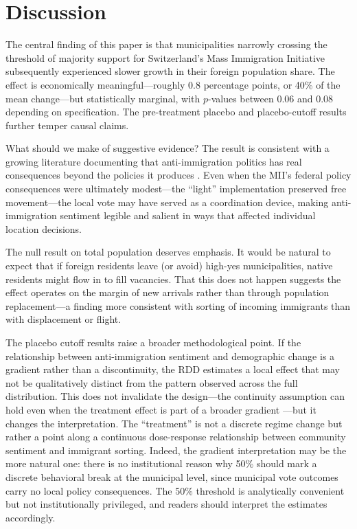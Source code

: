 \documentclass[12pt]{article}
\begin{document}
\section{Discussion}

The central finding of this paper is that municipalities narrowly crossing the threshold of majority support for Switzerland's Mass Immigration Initiative subsequently experienced slower growth in their foreign population share. The effect is economically meaningful---roughly 0.8 percentage points, or 40\% of the mean change---but statistically marginal, with $p$-values between 0.06 and 0.08 depending on specification. The pre-treatment placebo and placebo-cutoff results further temper causal claims.

What should we make of suggestive evidence? The result is consistent with a growing literature documenting that anti-immigration politics has real consequences beyond the policies it produces \citep{hangartner2019, tabellini2020, steinmayr2021}. Even when the MII's federal policy consequences were ultimately modest---the ``light'' implementation preserved free movement---the local vote may have served as a coordination device, making anti-immigration sentiment legible and salient in ways that affected individual location decisions.

The null result on total population deserves emphasis. It would be natural to expect that if foreign residents leave (or avoid) high-yes municipalities, native residents might flow in to fill vacancies. That this does not happen suggests the effect operates on the margin of new arrivals rather than through population replacement---a finding more consistent with sorting of incoming immigrants than with displacement or flight.

The placebo cutoff results raise a broader methodological point. If the relationship between anti-immigration sentiment and demographic change is a gradient rather than a discontinuity, the RDD estimates a local effect that may not be qualitatively distinct from the pattern observed across the full distribution. This does not invalidate the design---the continuity assumption can hold even when the treatment effect is part of a broader gradient \citep{lee2010}---but it changes the interpretation. The ``treatment'' is not a discrete regime change but rather a point along a continuous dose-response relationship between community sentiment and immigrant sorting. Indeed, the gradient interpretation may be the more natural one: there is no institutional reason why 50\% should mark a discrete behavioral break at the municipal level, since municipal vote outcomes carry no local policy consequences. The 50\% threshold is analytically convenient but not institutionally privileged, and readers should interpret the estimates accordingly.
\end{document}
